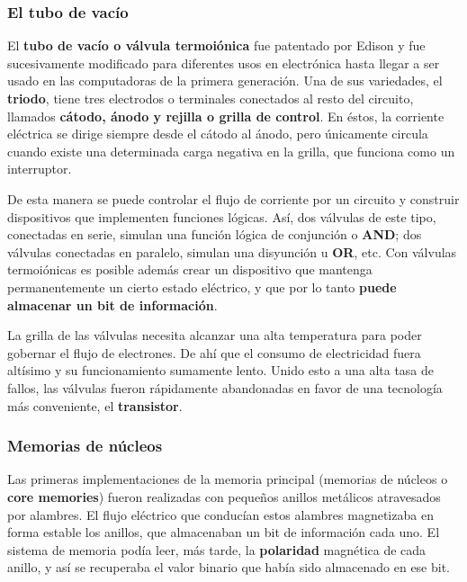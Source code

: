 \documentclass[spanish,A4,]{article}
\begin{document}
\subsubsection{El tubo de vacío}\label{el-tubo-de-vacuxedo}

El \textbf{tubo de vacío o válvula termoiónica} fue patentado por Edison
y fue sucesivamente modificado para diferentes usos en electrónica hasta
llegar a ser usado en las computadoras de la primera generación. Una de
sus variedades, el \textbf{triodo}, tiene tres electrodos o terminales
conectados al resto del circuito, llamados \textbf{cátodo, ánodo y
rejilla o grilla de control}. En éstos, la corriente eléctrica se dirige
siempre desde el cátodo al ánodo, pero únicamente circula cuando existe
una determinada carga negativa en la grilla, que funciona como un
interruptor.

De esta manera se puede controlar el flujo de corriente por un circuito
y construir dispositivos que implementen funciones lógicas. Así, dos
válvulas de este tipo, conectadas en serie, simulan una función lógica
de conjunción o \textbf{AND}; dos válvulas conectadas en paralelo,
simulan una disyunción u \textbf{OR}, etc. Con válvulas termoiónicas es
posible además crear un dispositivo que mantenga permanentemente un
cierto estado eléctrico, y que por lo tanto \textbf{puede almacenar un
bit de información}.

La grilla de las válvulas necesita alcanzar una alta temperatura para
poder gobernar el flujo de electrones. De ahí que el consumo de
electricidad fuera altísimo y su funcionamiento sumamente lento. Unido
esto a una alta tasa de fallos, las válvulas fueron rápidamente
abandonadas en favor de una tecnología más conveniente, el
\textbf{transistor}.

\subsubsection{Memorias de núcleos}\label{memorias-de-nuxfacleos}

Las primeras implementaciones de la memoria principal (memorias de
núcleos o \textbf{core memories}) fueron realizadas con pequeños anillos
metálicos atravesados por alambres. El flujo eléctrico que conducían
estos alambres magnetizaba en forma estable los anillos, que almacenaban
un bit de información cada uno. El sistema de memoria podía leer, más
tarde, la \textbf{polaridad} magnética de cada anillo, y así se
recuperaba el valor binario que había sido almacenado en ese bit.
\end{document}

